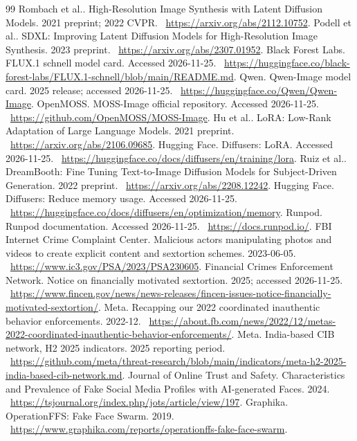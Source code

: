 \documentclass[10pt,a4paper]{article}
\begin{document}
\begin{thebibliography}{99}
 Rombach et al.. High-Resolution Image Synthesis with Latent Diffusion Models. 2021 preprint; 2022 CVPR. \ \url{https://arxiv.org/abs/2112.10752}.
 Podell et al.. SDXL: Improving Latent Diffusion Models for High-Resolution Image Synthesis. 2023 preprint. \ \url{https://arxiv.org/abs/2307.01952}.
 Black Forest Labs. FLUX.1 schnell model card. Accessed 2026-11-25. \ \url{https://huggingface.co/black-forest-labs/FLUX.1-schnell/blob/main/README.md}.
 Qwen. Qwen-Image model card. 2025 release; accessed 2026-11-25. \ \url{https://huggingface.co/Qwen/Qwen-Image}.
 OpenMOSS. MOSS-Image official repository. Accessed 2026-11-25. \ \url{https://github.com/OpenMOSS/MOSS-Image}.
 Hu et al.. LoRA: Low-Rank Adaptation of Large Language Models. 2021 preprint. \ \url{https://arxiv.org/abs/2106.09685}.
 Hugging Face. Diffusers: LoRA. Accessed 2026-11-25. \ \url{https://huggingface.co/docs/diffusers/en/training/lora}.
 Ruiz et al.. DreamBooth: Fine Tuning Text-to-Image Diffusion Models for Subject-Driven Generation. 2022 preprint. \ \url{https://arxiv.org/abs/2208.12242}.
 Hugging Face. Diffusers: Reduce memory usage. Accessed 2026-11-25. \ \url{https://huggingface.co/docs/diffusers/en/optimization/memory}.
 Runpod. Runpod documentation. Accessed 2026-11-25. \ \url{https://docs.runpod.io/}.
 FBI Internet Crime Complaint Center. Malicious actors manipulating photos and videos to create explicit content and sextortion schemes. 2023-06-05. \ \url{https://www.ic3.gov/PSA/2023/PSA230605}.
 Financial Crimes Enforcement Network. Notice on financially motivated sextortion. 2025; accessed 2026-11-25. \ \url{https://www.fincen.gov/news/news-releases/fincen-issues-notice-financially-motivated-sextortion/}.
 Meta. Recapping our 2022 coordinated inauthentic behavior enforcements. 2022-12. \ \url{https://about.fb.com/news/2022/12/metas-2022-coordinated-inauthentic-behavior-enforcements/}.
 Meta. India-based CIB network, H2 2025 indicators. 2025 reporting period. \ \url{https://github.com/meta/threat-research/blob/main/indicators/meta-h2-2025-india-based-cib-network.md}.
 Journal of Online Trust and Safety. Characteristics and Prevalence of Fake Social Media Profiles with AI-generated Faces. 2024. \ \url{https://tsjournal.org/index.php/jots/article/view/197}.
 Graphika. OperationFFS: Fake Face Swarm. 2019. \ \url{https://www.graphika.com/reports/operationffs-fake-face-swarm}.

\end{thebibliography}
\end{document}
